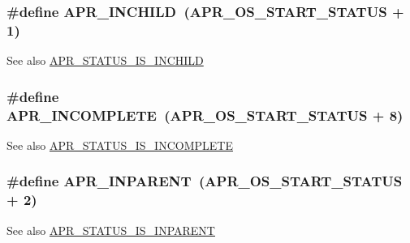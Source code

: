 \subsubsection[{\texorpdfstring{A\+P\+R\+\_\+\+I\+N\+C\+H\+I\+LD}{APR_INCHILD}}]{\setlength{\rightskip}{0pt plus 5cm}\#define A\+P\+R\+\_\+\+I\+N\+C\+H\+I\+LD~({\bf A\+P\+R\+\_\+\+O\+S\+\_\+\+S\+T\+A\+R\+T\+\_\+\+S\+T\+A\+T\+US} + 1)}\hypertarget{group__APR__Error_ga5a2bb63099778699feeae9627474c179}{}\label{group__APR__Error_ga5a2bb63099778699feeae9627474c179}
\begin{DoxySeeAlso}{See also}
\hyperlink{group__APR__STATUS__IS_gad60d170a73ed74ec209a1b2165cacb61}{A\+P\+R\+\_\+\+S\+T\+A\+T\+U\+S\+\_\+\+I\+S\+\_\+\+I\+N\+C\+H\+I\+LD} 
\end{DoxySeeAlso}
\subsubsection[{\texorpdfstring{A\+P\+R\+\_\+\+I\+N\+C\+O\+M\+P\+L\+E\+TE}{APR_INCOMPLETE}}]{\setlength{\rightskip}{0pt plus 5cm}\#define A\+P\+R\+\_\+\+I\+N\+C\+O\+M\+P\+L\+E\+TE~({\bf A\+P\+R\+\_\+\+O\+S\+\_\+\+S\+T\+A\+R\+T\+\_\+\+S\+T\+A\+T\+US} + 8)}\hypertarget{group__APR__Error_ga64dff43b83bcefd3f3c751be6b864ca1}{}\label{group__APR__Error_ga64dff43b83bcefd3f3c751be6b864ca1}
\begin{DoxySeeAlso}{See also}
\hyperlink{group__APR__STATUS__IS_ga8385878e572abf0b2f78a0ab7d1bc8a5}{A\+P\+R\+\_\+\+S\+T\+A\+T\+U\+S\+\_\+\+I\+S\+\_\+\+I\+N\+C\+O\+M\+P\+L\+E\+TE} 
\end{DoxySeeAlso}
\subsubsection[{\texorpdfstring{A\+P\+R\+\_\+\+I\+N\+P\+A\+R\+E\+NT}{APR_INPARENT}}]{\setlength{\rightskip}{0pt plus 5cm}\#define A\+P\+R\+\_\+\+I\+N\+P\+A\+R\+E\+NT~({\bf A\+P\+R\+\_\+\+O\+S\+\_\+\+S\+T\+A\+R\+T\+\_\+\+S\+T\+A\+T\+US} + 2)}\hypertarget{group__APR__Error_ga79abc0fb43e51e0db87f90fa49745d89}{}\label{group__APR__Error_ga79abc0fb43e51e0db87f90fa49745d89}
\begin{DoxySeeAlso}{See also}
\hyperlink{group__APR__STATUS__IS_ga4471f8de6eda3a673aa1f306114c012e}{A\+P\+R\+\_\+\+S\+T\+A\+T\+U\+S\+\_\+\+I\+S\+\_\+\+I\+N\+P\+A\+R\+E\+NT} 
\end{DoxySeeAlso}
